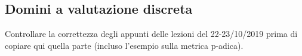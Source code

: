 \subsection{Domini a valutazione discreta}

Controllare la correttezza degli appunti delle lezioni del 22-23/10/2019 prima di copiare qui quella parte (incluso l'esempio sulla metrica p-adica).

